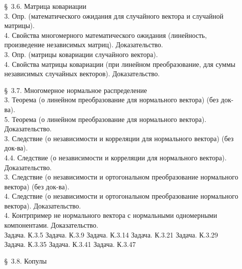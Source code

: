 \documentclass[10pt]{amsart}
\begin{document}
\begin{enumerate}
\begin{enumerate}
\item[\S\, 3.6.] Матрица ковариации \\
3. Опр. (математического ожидания для случайного вектора и случайной матрицы). \\
4. Свойства многомерного математического ожидания (линейность, произведение независимых матриц). Доказательство. \\ 
3. Опр. (матрицы ковариации случайного вектора). \\
4. Свойства матрицы ковариации (при линейном преобразование, для суммы независимых случайных векторов). Доказательство. \\


\item[\S\, 3.7.] Многомерное нормальное распределение \\

3. Теорема (о линейном преобразование для нормального вектора) (без док-ва). \\
5. Теорема (о линейном преобразование для нормального вектора). Доказательство. \\
3. Следствие (о независимости и корреляции для нормального вектора) (без док-ва). \\ 
4.4. Следствие (о независимости и корреляции для нормального вектора). Доказательство. \\ 
3. Следствие (о независимости и  ортогональном преобразование нормального вектора) (без док-ва). \\ 
4. Следствие (о независимости и  ортогональном преобразование нормального вектора). Доказательство. \\ 
4. Контрпример не нормального вектора с нормальными одномерными компонентами. Доказательство. \\ 
Задача. К.3.5
Задача. К.3.9
Задача. К.3.14
Задача. К.3.21
Задача. К.3.29
Задача. К.3.35
Задача. К.3.41
Задача. К.3.47

\item[\S\, 3.8.] Копулы \\
        

\end{enumerate}
\end{enumerate}
\end{document}
